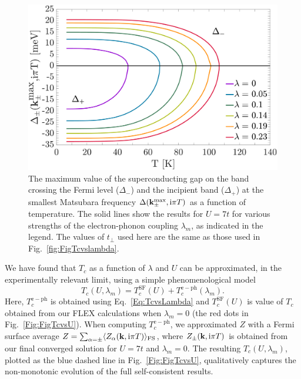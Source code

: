 \documentclass[%
 reprint,
 superscriptaddress,
nofootinbib,
nobibnotes,
 amsmath,amssymb,
 aps,
 prb,
 dvipsnames, 
 floatfix
]{revtex4-2}
\begin{document}
\begin{figure}[t]
    \centering
    \includegraphics[width=\columnwidth]{figures/Figure4.pdf}
    \caption{The maximum value of the superconducting gap on the band crossing the Fermi level ($\Delta_-$) and the incipient band ($\Delta_+$) at the smallest Matsubara frequency 
    $\Delta({\bf k}_\pm^\text{max},\text{i}\pi T)$ as a function of temperature. The solid lines show the results for $U=7t$ for various strengths of the electron-phonon coupling $\lambda_m$, as indicated in the legend. 
    The values of $t_\perp$ used here are the same as those used in Fig.~\ref{fig:FigTcvslambda}.
    }
    \label{fig:FigGapvsT}
\end{figure}
We have found that $T_c$ as a function of $\lambda$ and $U$ can be approximated, in the experimentally relevant limit, using a simple phenomenological model
\begin{equation}
    T_c (U,\lambda_m) = T^{\mathrm{SF}}_c (U) + T^{\mathrm{e-ph}}_c (\lambda_m).  
    \label{Eq:TcvsULambda}
\end{equation}
Here, $T^{\mathrm{e-ph}}_c$ is obtained using Eq.~\eqref{Eq:TcvsLambda} and 
$T^{\mathrm{SF}}_c (U)$ is value of $T_c$ obtained from our FLEX 
calculations when $\lambda_m = 0$ (the red dots in Fig.~\ref{Fig:FigTcvsU}).  
When computing  $T^{\mathrm{e-ph}}_c$, we approximated $Z$ with a Fermi surface average $Z = \sum_{\alpha = \pm}\langle Z_\alpha({\bf k},\text{i}\pi T) \rangle_\mathrm{FS}$, where $Z_\pm({\bf k},\text{i}\pi T)$ is obtained from our final converged solution for $U=7t$ and $\lambda_m = 0$. The resulting $T_c (U,\lambda_m)$, plotted as the blue dashed line in Fig.~\ref{Fig:FigTcvsU}, qualitatively captures the non-monotonic evolution of the full self-consistent results.
\end{document}
